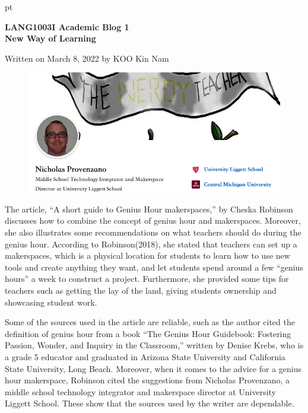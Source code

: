 \documentclass[12pt]{article}
\begin{document}
 pt
\begin{center}
{\bf \Large LANG1003I Academic Blog 1\\New Way of Learning}
\end{center}
\vspace{0.3cm}
Written on March 8, 2022 by KOO Kin Nam\\
\begin{figure}
\includegraphics[scale = 0.3]{Photo2}
\caption[Yeah:]{}
\end{figure}

\blindtext
The article, “A short guide to Genius Hour makerspaces,” by Cheska Robinson discusses how to combine the concept of genius hour and makerspaces. Moreover, she also illustrates some recommendations on what teachers should do during the genius hour.  According to Robinson(2018), she stated that teachers can set up a makerspaces, which is a physical location for students to learn how to use new tools and create anything they want, and let students spend around a few “genius hours” a week to construct a project. Furthermore, she provided some tips for teachers such as getting the lay of the land, giving students ownership and showcasing student work.

Some of the sources used in the article are reliable, such as the author cited the definition of genius hour from a book “The Genius Hour Guidebook: Fostering Passion, Wonder, and Inquiry in the Classroom,” written by Denise Krebs, who is a grade 5 educator and graduated in Arizona State University and California State University, Long Beach. Moreover, when it comes to the advice for a genius hour makerspace, Robinson cited the suggestions from Nicholas Provenzano, a middle school technology integrator and makerspace director at University Liggett School. These show that the sources used by the writer are dependable. 
\end{document}
